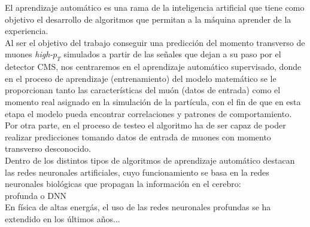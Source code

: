 El aprendizaje autom\'atico es una rama de la inteligencia artificial que tiene como objetivo el desarrollo de algoritmos que permitan a la m\'aquina aprender de la experiencia. \\

Al ser el objetivo del trabajo conseguir una predicci\'on del momento transverso de muones \textit{high-$p_{T}$} simulados a partir de las se\~nales que dejan a su paso por el detector CMS, nos centraremos en el aprendizaje autom\'atico supervisado, donde en el proceso de aprendizaje (entrenamiento) del modelo matem\'atico se le proporcionan tanto las caracter\'isticas del mu\'on (datos de entrada) como el momento real asignado en la simulaci\'on de la part\'icula, con el fin de que en esta etapa el modelo pueda encontrar correlaciones y patrones de comportamiento. Por otra parte, en el proceso de testeo el algoritmo ha de ser capaz de poder realizar predicciones tomando datos de entrada de muones con momento transverso desconocido. \\

Dentro de los distintos tipos de algoritmos de aprendizaje autom\'atico destacan las redes neuronales artificiales, cuyo funcionamiento se basa en la redes neuronales biol\'ogicas que propagan la informaci\'on en el cerebro: \\

profunda o DNN \\


En f\'isica de altas energ\'as, el uso de las redes neuronales profundas se ha extendido en los \'ultimos a\~nos...
